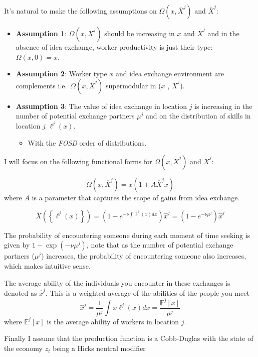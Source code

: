 \documentclass[
  letterpaper,
  DIV=11,
  numbers=noendperiod]{scrreprt}
\providecommand{\tightlist}{%
  \setlength{\itemsep}{0pt}\setlength{\parskip}{0pt}}\usepackage{longtable,booktabs,array}
\begin{document}
It's natural to make the following assumptions on
\(\Omega(x, \overline{X}^j)\) and \(\overline{X}^j\):

\begin{itemize}
\tightlist
\item
  \textbf{Assumption 1}: \(\Omega(x, \overline{X}^j)\) should be
  increasing in \(x\) and \(\overline{X}^j\) and in the absence of idea
  exchange, worker productivity is just their type:
  \(\Omega(x, 0) = x\).
\item
  \textbf{Assumption 2}: Worker type \(x\) and idea exchange environment
  are complements i.e.~\(\Omega(x, \overline{X}^j)\) supermodular in
  (\(x\) , \(\overline{X}^j\)).
\item
  \textbf{Assumption 3}: The value of idea exchange in location \(j\) is
  increasing in the number of potential exchange partners \(\mu^j\) and
  on the distribution of skills in location \(j\) \(\ell^j(x)\).

  \begin{itemize}
  \tightlist
  \item
    With the \emph{FOSD} order of distributions.
  \end{itemize}
\end{itemize}

I will focus on the following functional forms for
\(\Omega(x, \overline{X}^j)\) and \(\overline{X}^j\):

\[\Omega(x, \overline{X}^j) = x(1 + A \overline{X}^j x)\] where \(A\) is
a parameter that captures the scope of gains from idea exchange.

\[
    \overline{X}\left(\left\{\ell^j(x)\right\}\right) = \left(1 - e^{-\nu \int \ell^j(x) dx}\right)\hat{x}^j =\left(1 - e^{-\nu \mu^j} \right)\hat{x}^j
\]

The probability of encountering someone during each moment of time
seeking is given by \(1 - \exp(-ν \mu^j)\), note that as the number of
potential exchange partners (\(\mu^j\)) increases, the probability of
encountering someone also increases, which makes intuitive sense.

The average ability of the individuals you encounter in these exchanges
is denoted as \(\hat{x}^j\). This is a weighted average of the abilities
of the people you meet
\[\hat{x}^j = \frac{1}{\mu^j}\int{x\ell^j(x)dx}=\frac{\mathbb{E}^j[x]}{\mu^j}\]
where \(\mathbb{E}^j[x]\) is the average ability of workers in location
\(j\).

Finally I assume that the production function is a Cobb-Duglas with the
state of the economy \(z_t\) being a Hicks neutral modifier
\end{document}
